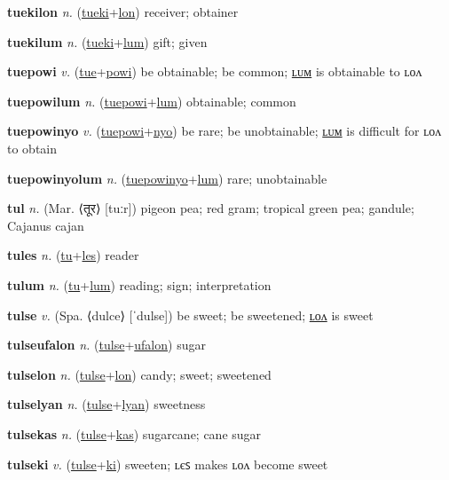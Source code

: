 \textbf{\hypertarget{tuekilon}{tuekilon}} \textit{n.} (\hyperlink{tueki}{tueki}+\allowbreak \hyperlink{lon}{lon})
receiver; obtainer

\textbf{\hypertarget{tuekilum}{tuekilum}} \textit{n.} (\hyperlink{tueki}{tueki}+\allowbreak \hyperlink{lum}{lum})
gift; given

\textbf{\hypertarget{tuepowi}{tuepowi}} \textit{v.} (\hyperlink{tue}{tue}+\allowbreak \hyperlink{powi}{powi})
be obtainable; be common; \hyperlink{tuepowilum}{ʟᴜᴍ} is obtainable to ʟᴏᴧ

\textbf{\hypertarget{tuepowilum}{tuepowilum}} \textit{n.} (\hyperlink{tuepowi}{tuepowi}+\allowbreak \hyperlink{lum}{lum})
obtainable; common

\textbf{\hypertarget{tuepowinyo}{tuepowinyo}} \textit{v.} (\hyperlink{tuepowi}{tuepowi}+\allowbreak \hyperlink{nyo}{nyo})
be rare; be unobtainable; \hyperlink{tuepowinyolum}{ʟᴜᴍ} is difficult for ʟᴏᴧ to obtain

\textbf{\hypertarget{tuepowinyolum}{tuepowinyolum}} \textit{n.} (\hyperlink{tuepowinyo}{tuepowinyo}+\allowbreak \hyperlink{lum}{lum})
rare; unobtainable

\textbf{\hypertarget{tul}{tul}} \textit{n.} (Mar. ⟨{\devanagari{}तूर}⟩ [tuːr])
pigeon pea; red gram; tropical green pea; gandule; Cajanus cajan

\textbf{\hypertarget{tules}{tules}} \textit{n.} (\hyperlink{tu}{tu}+\allowbreak \hyperlink{les}{les})
reader

\textbf{\hypertarget{tulum}{tulum}} \textit{n.} (\hyperlink{tu}{tu}+\allowbreak \hyperlink{lum}{lum})
reading; sign; interpretation

\textbf{\hypertarget{tulse}{tulse}} \textit{v.} (Spa. ⟨dulce⟩ [ˈdulse])
be sweet; be sweetened; \hyperlink{tulselon}{ʟᴏᴧ} is sweet

\textbf{\hypertarget{tulseufalon}{tulseufalon}} \textit{n.} (\hyperlink{tulse}{tulse}+\allowbreak \hyperlink{ufalon}{ufalon})
sugar

\textbf{\hypertarget{tulselon}{tulselon}} \textit{n.} (\hyperlink{tulse}{tulse}+\allowbreak \hyperlink{lon}{lon})
candy; sweet; sweetened

\textbf{\hypertarget{tulselyan}{tulselyan}} \textit{n.} (\hyperlink{tulse}{tulse}+\allowbreak \hyperlink{lyan}{lyan})
sweetness

\textbf{\hypertarget{tulsekas}{tulsekas}} \textit{n.} (\hyperlink{tulse}{tulse}+\allowbreak \hyperlink{kas}{kas})
sugarcane; cane sugar

\textbf{\hypertarget{tulseki}{tulseki}} \textit{v.} (\hyperlink{tulse}{tulse}+\allowbreak \hyperlink{ki}{ki})
sweeten; ʟєꜱ makes ʟᴏᴧ become sweet

